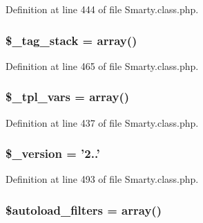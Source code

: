\-Definition at line 444 of file \-Smarty.\-class.\-php.

\hypertarget{class_smarty_a8bc334635a0aa8e117a5e822ca71ee67}{
\subsubsection[{\$\-\_\-tag\-\_\-stack}]{\setlength{\rightskip}{0pt plus 5cm}\$\-\_\-tag\-\_\-stack = array()}}\label{class_smarty_a8bc334635a0aa8e117a5e822ca71ee67}


\-Definition at line 465 of file \-Smarty.\-class.\-php.

\hypertarget{class_smarty_ac5b23df7404c26573f1d6efad81b9db9}{
\subsubsection[{\$\-\_\-tpl\-\_\-vars}]{\setlength{\rightskip}{0pt plus 5cm}\${\bf \-\_\-tpl\-\_\-vars} = array()}}\label{class_smarty_ac5b23df7404c26573f1d6efad81b9db9}


\-Definition at line 437 of file \-Smarty.\-class.\-php.

\hypertarget{class_smarty_a01caaf3772469caf98e39064bf5d7d8f}{
\subsubsection[{\$\-\_\-version}]{\setlength{\rightskip}{0pt plus 5cm}\$\-\_\-version = '2..'}}\label{class_smarty_a01caaf3772469caf98e39064bf5d7d8f}


\-Definition at line 493 of file \-Smarty.\-class.\-php.

\hypertarget{class_smarty_aca2078dde09728b223cdffe8209e6dcc}{
\subsubsection[{\$autoload\-\_\-filters}]{\setlength{\rightskip}{0pt plus 5cm}\$autoload\-\_\-filters = array()}}\label{class_smarty_aca2078dde09728b223cdffe8209e6dcc}


